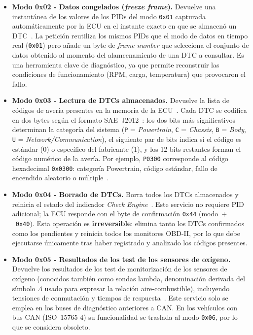 \begin{itemize}
    \item \textbf{Modo 0x02 - Datos congelados (\textit{freeze frame}).} Devuelve una instantánea de los valores de los PIDs del modo \texttt{0x01} capturada automáticamente por la ECU en el instante exacto en que se almacenó un DTC~\cite{SAEJ1979:2014}. La petición reutiliza los mismos PIDs que el modo de datos en tiempo real (\texttt{0x01}) pero añade un byte de \textit{frame number} que selecciona el conjunto de datos obtenido al momento del alamcenamiento de una DTC a consultar. Es una herramienta clave de diagnóstico, ya que permite reconstruir las condiciones de funcionamiento (RPM, carga, temperatura) que provocaron el fallo.

    \item \textbf{Modo 0x03 - Lectura de DTCs almacenados.} Devuelve la lista de códigos de avería presentes en la memoria de la ECU~\cite{SAEJ1979:2014}. Cada DTC se codifica en dos bytes según el formato SAE~J2012~\cite{SAEJ2012:2016}: los dos bits más significativos determinan la categoría del sistema (\texttt{P} = \textit{Powertrain}, \texttt{C} = \textit{Chassis}, \texttt{B} = \textit{Body}, \texttt{U} = \textit{Network/Communication}), el siguiente par de bits indica si el código es estándar (0) o específico del fabricante (1), y los 12 bits restantes forman el código numérico de la avería. Por ejemplo, \texttt{P0300} corresponde al código hexadecimal \texttt{0x0300}: categoría Powertrain, código estándar, fallo de encendido aleatorio o múltiple~\cite{SAEJ2012:2016, WaleedDTC}.

    \item \textbf{Modo 0x04 - Borrado de DTCs.} Borra todos los DTCs almacenados y reinicia el estado del indicador \textit{Check Engine}~\cite{SAEJ1979:2014}. Este servicio no requiere PID adicional; la ECU responde con el byte de confirmación \texttt{0x44} (modo~$+$~\texttt{0x40}). Esta operación es \textbf{irreversible}: elimina tanto los DTCs confirmados como los pendientes y reinicia todos los monitores OBD-II, por lo que debe ejecutarse únicamente tras haber registrado y analizado los códigos presentes.

    \item \textbf{Modo 0x05 - Resultados de los test de los sensores de oxígeno.} Devuelve los resultados de los test de monitorización de los sensores de oxígeno (conocidos también como sondas lambda, denominación derivada del símbolo $\Lambda$ usado para expresar la relación aire-combustible), incluyendo tensiones de conmutación y tiempos de respuesta~\cite{SAEJ1979:2014}. Este servicio solo se emplea en los buses de diagnóstico anteriores a CAN. En los vehículos con bus CAN (ISO~15765-4) su funcionalidad se traslada al modo \texttt{0x06}, por lo que se considera obsoleto.


\end{itemize}
